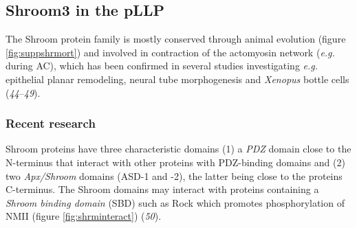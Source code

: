 \documentclass[10pt, b5paper, singlespacinge, twoside]{reedthesis} %
\theoremstyle{definition}
\theoremstyle{definition}
\theoremstyle{definition}
\theoremstyle{remark}
\begin{document}
\hypertarget{shroom3-in-the-pllp}{%
\subsection{Shroom3 in the pLLP}\label{shroom3-in-the-pllp}}

The Shroom protein family is mostly conserved through animal evolution (figure \ref{fig:suppshrmort}) and involved in contraction of the actomyosin network (\emph{e.g.} during AC), which has been confirmed in several studies investigating \emph{e.g.} epithelial planar remodeling, neural tube morphogenesis and \emph{Xenopus} bottle cells (\emph{44}--\emph{49}).

\hypertarget{intro-shroom}{%
\subsubsection{Recent research}\label{intro-shroom}}

Shroom proteins have three characteristic domains (1) a \emph{PDZ} domain close to the N-terminus that interact with other proteins with PDZ-binding domains and (2) two \emph{Apx/Shroom} domains (ASD-1 and -2), the latter being close to the proteins C-terminus. The Shroom domains may interact with proteins containing a \emph{Shroom binding domain} (SBD) such as Rock which promotes phosphorylation of NMII (figure \ref{fig:shrminteract}) (\emph{50}).
\end{document}
